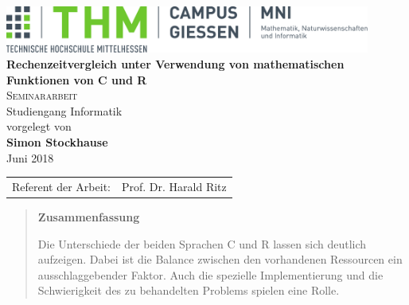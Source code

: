 \documentclass[%
	BCOR=8.25mm,         %
	DIV=12,              %
	parskip=half,				 %
	bibliography=totoc,	 %
	headsepline=on,      %
	openany
	]{scrbook}
\begin{document}
\frontmatter

\begin{titlepage}
	\begin{center}
	\includegraphics[width=0.9\textwidth]{img/mni-logo}\\[5cm]
	\textbf{\huge\sffamily Rechenzeitvergleich unter Verwendung von mathematischen Funktionen von C und R}\\[2cm]
	\textsc{\Large Seminararbeit}\\Studiengang Informatik\\[2cm]
	vorgelegt von\\
	\textbf{Simon Stockhause}\\ [1.5cm] 
	Juni 2018
	\end{center}
	\vfill
	\begin{tabular}{ll}
		Referent der Arbeit: & Prof. Dr. Harald Ritz\\ 
	\end{tabular}
\end{titlepage}
\cleardoubleemptypage

\pagestyle{empty}


\pagestyle{empty}
\begin{quote}
	\vspace*{4cm}

	\begin{center}
		\textbf{\Large\sffamily Zusammenfassung}
	\end{center}

	Die Unterschiede der beiden Sprachen C und R lassen sich deutlich aufzeigen. Dabei ist die Balance zwischen den vorhandenen Ressourcen ein ausschlaggebender Faktor. Auch die spezielle Implementierung und die Schwierigkeit des zu behandelten Problems spielen eine Rolle.

	
\end{quote}
\cleardoubleemptypage


\pagestyle{empty}
{
	\renewcommand{\thispagestyle}[1]{}
	\tableofcontents
}
\clearpage
\pagestyle{plain}
\pagestyle{empty}
{
	\renewcommand{\thispagestyle}[1]{}
	\listoffigures
}
\clearpage
\pagestyle{plain}

\mainmatter 
\pagestyle{headings}





\backmatter 

\appendix


\end{document}
